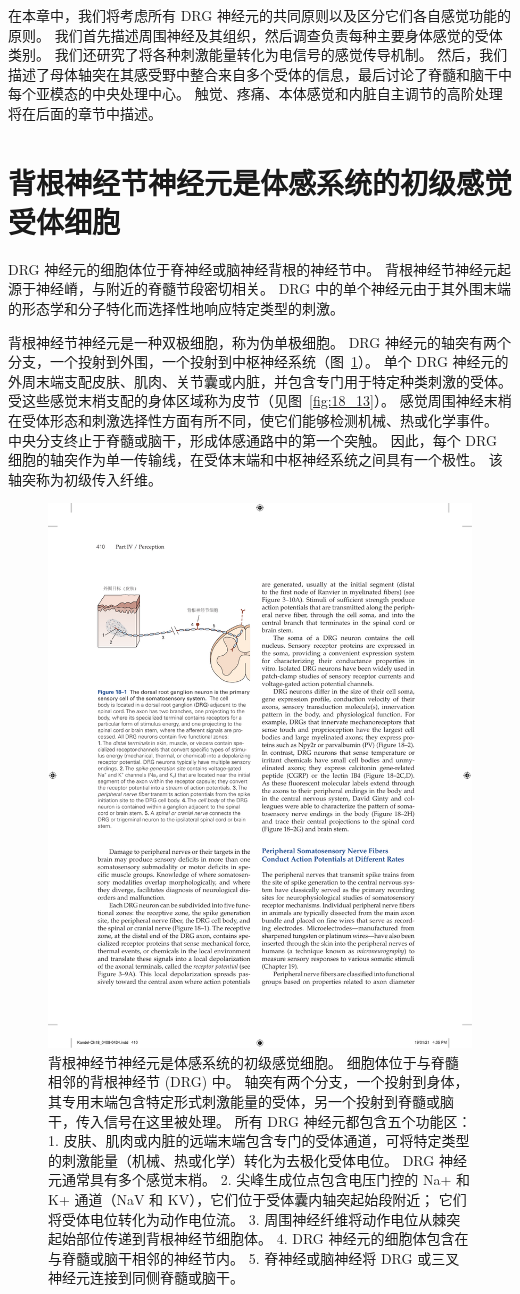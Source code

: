 在本章中，我们将考虑所有 DRG 神经元的共同原则以及区分它们各自感觉功能的原则。
我们首先描述周围神经及其组织，然后调查负责每种主要身体感觉的受体类别。
我们还研究了将各种刺激能量转化为电信号的感觉传导机制。
然后，我们描述了母体轴突在其感受野中整合来自多个受体的信息，最后讨论了脊髓和脑干中每个亚模态的中央处理中心。
触觉、疼痛、本体感觉和内脏自主调节的高阶处理将在后面的章节中描述。



\section{背根神经节神经元是体感系统的初级感觉受体细胞}

DRG 神经元的细胞体位于脊神经或脑神经背根的神经节中。
背根神经节神经元起源于神经嵴，与附近的脊髓节段密切相关。
DRG 中的单个神经元由于其外围末端的形态学和分子特化而选择性地响应特定类型的刺激。


背根神经节神经元是一种双极细胞，称为伪单极细胞。 
DRG 神经元的轴突有两个分支，一个投射到外围，一个投射到中枢神经系统（图~\ref{fig:18_1}）。
单个 DRG 神经元的外周末端支配皮肤、肌肉、关节囊或内脏，并包含专门用于特定种类刺激的受体。 
受这些感觉末梢支配的身体区域称为皮节（见图~\ref{fig:18_13}）。
感觉周围神经末梢在受体形态和刺激选择性方面有所不同，使它们能够检测机械、热或化学事件。
中央分支终止于脊髓或脑干，形成体感通路中的第一个突触。
因此，每个 DRG 细胞的轴突作为单一传输线，在受体末端和中枢神经系统之间具有一个极性。
该轴突称为初级传入纤维。


\begin{figure}[htbp]
	\centering
	\includegraphics[width=0.5\linewidth]{chap18/fig_18_1}
	\caption{背根神经节神经元是体感系统的初级感觉细胞。 
		细胞体位于与脊髓相邻的背根神经节 (DRG) 中。
		轴突有两个分支，一个投射到身体，其专用末端包含特定形式刺激能量的受体，另一个投射到脊髓或脑干，传入信号在这里被处理。 
		所有 DRG 神经元都包含五个功能区：
		1. 皮肤、肌肉或内脏的远端末端包含专门的受体通道，可将特定类型的刺激能量（机械、热或化学）转化为去极化受体电位。 
		DRG 神经元通常具有多个感觉末梢。
		2. 尖峰生成位点包含电压门控的 Na+ 和 K+ 通道（NaV 和 KV），它们位于受体囊内轴突起始段附近； 它们将受体电位转化为动作电位流。 
		3. 周围神经纤维将动作电位从棘突起始部位传递到背根神经节细胞体。 
		4. DRG 神经元的细胞体包含在与脊髓或脑干相邻的神经节内。 
		5. 脊神经或脑神经将 DRG 或三叉神经元连接到同侧脊髓或脑干。}
	\label{fig:18_1}
\end{figure}


